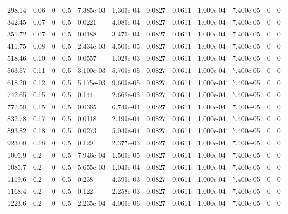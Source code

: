 \documentclass[preview]{standalone}
\begin{document}
{{\begin{tabular}{L{1.2cm}C{1.2cm} C{0.3cm}C{0.5cm} C{1.4cm}C{1.4cm} C{1.4cm}C{1.4cm} C{1.6cm}C{1.6cm} C{1.6cm}C{1.6cm}}
  298.14  &  0.06  & 0     & 0.5 &  7.385e-03  & 1.360e-04  &  0.0827&   0.0611& 1.000e-04 & 7.400e-05   &  0 & 0  \\ 
  342.45  &  0.07  & 0     & 0.5 &  0.0221  & 4.080e-04  &  0.0827&   0.0611& 1.000e-04 & 7.400e-05   &  0 & 0  \\ 
  351.72  &  0.07  & 0     & 0.5 &  0.0188  & 3.470e-04  &  0.0827&   0.0611& 1.000e-04 & 7.400e-05   &  0 & 0  \\ 
  411.75  &  0.08  & 0     & 0.5 &  2.434e-03  & 4.500e-05  &  0.0827&   0.0611& 1.000e-04 & 7.400e-05   &  0 & 0  \\ 
  518.46  &  0.10  & 0     & 0.5 &  0.0557  & 1.029e-03  &  0.0827&   0.0611& 1.000e-04 & 7.400e-05   &  0 & 0  \\ 
  563.57  &  0.11  & 0     & 0.5 &  3.100e-03  & 5.700e-05  &  0.0827&   0.0611& 1.000e-04 & 7.400e-05   &  0 & 0  \\ 
  618.20  &  0.12  & 0     & 0.5 &  5.175e-03  & 9.600e-05  &  0.0827&   0.0611& 1.000e-04 & 7.400e-05   &  0 & 0  \\ 
  742.65  &  0.15  & 0     & 0.5 &  0.144  & 2.668e-03  &  0.0827&   0.0611& 1.000e-04 & 7.400e-05   &  0 & 0  \\ 
  772.58  &  0.15  & 0     & 0.5 &  0.0365  & 6.740e-04  &  0.0827&   0.0611& 1.000e-04 & 7.400e-05   &  0 & 0  \\ 
  832.78  &  0.17  & 0     & 0.5 &  0.0118  & 2.190e-04  &  0.0827&   0.0611& 1.000e-04 & 7.400e-05   &  0 & 0  \\ 
  893.82  &  0.18  & 0     & 0.5 &  0.0273  & 5.040e-04  &  0.0827&   0.0611& 1.000e-04 & 7.400e-05   &  0 & 0  \\ 
  923.08  &  0.18  & 0     & 0.5 &  0.129  & 2.377e-03  &  0.0827&   0.0611& 1.000e-04 & 7.400e-05   &  0 & 0  \\ 
  1005.9  &   0.2  & 0     & 0.5 &  7.946e-04  & 1.500e-05  &  0.0827&   0.0611& 1.000e-04 & 7.400e-05   &  0 & 0  \\ 
  1085.7  &   0.2  & 0     & 0.5 &  5.655e-03  & 1.040e-04  &  0.0827&   0.0611& 1.000e-04 & 7.400e-05   &  0 & 0  \\ 
  1119.6  &   0.2  & 0     & 0.5 &  0.238  & 4.390e-03  &  0.0827&   0.0611& 1.000e-04 & 7.400e-05   &  0 & 0  \\ 
  1168.4  &   0.2  & 0     & 0.5 &  0.122  & 2.258e-03  &  0.0827&   0.0611& 1.000e-04 & 7.400e-05   &  0 & 0  \\ 
  1223.6  &   0.2  & 0     & 0.5 &  2.235e-04  & 4.000e-06  &  0.0827&   0.0611& 1.000e-04 & 7.400e-05   &  0 & 0  \\ 

\end{tabular}}}
\end{document}
